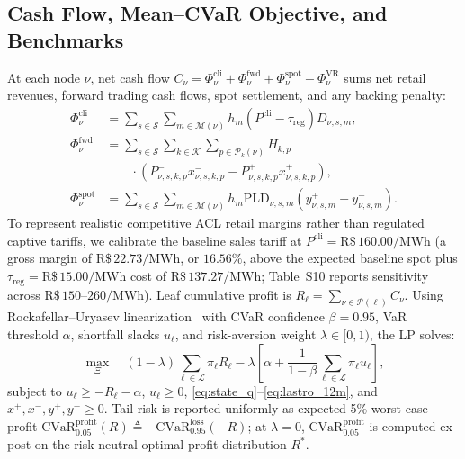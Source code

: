 \documentclass[10pt,journal]{IEEEtran}
\begin{document}
\subsection{Cash Flow, Mean--CVaR Objective, and Benchmarks}
At each node $\nu$, net cash flow $C_\nu = \Phi^{\text{cli}}_\nu + \Phi^{\text{fwd}}_\nu + \Phi^{\text{spot}}_\nu - \Phi^{\text{VR}}_\nu$ sums net retail revenues, forward trading cash flows, spot settlement, and any backing penalty:
\begin{align}
\Phi^{\text{cli}}_\nu &= \sum_{s \in \mathcal{S}} \sum_{m \in \mathcal{M}(\nu)} h_m \left( P^{\text{cli}} - \tau_{\text{reg}} \right) D_{\nu,s,m}, \\
\Phi^{\text{fwd}}_\nu &= \sum_{s \in \mathcal{S}} \sum_{k \in \mathcal{K}} \sum_{p \in \mathcal{P}_k(\nu)} H_{k,p} \nonumber \\
&\qquad \cdot \left( P^-_{\nu,s,k,p} x^-_{\nu,s,k,p} - P^+_{\nu,s,k,p} x^+_{\nu,s,k,p} \right), \\
\Phi^{\text{spot}}_\nu &= \sum_{s \in \mathcal{S}} \sum_{m \in \mathcal{M}(\nu)} h_m \text{PLD}_{\nu,s,m} \left( y^+_{\nu,s,m} - y^-_{\nu,s,m} \right).
\end{align}
To represent realistic competitive ACL retail margins rather than regulated captive tariffs, we calibrate the baseline sales tariff at $P^{\text{cli}} = \text{R\$}\,160.00/\text{MWh}$ (a gross margin of $\text{R\$}\,22.73/\text{MWh}$, or $16.56\%$, above the expected baseline spot plus $\tau_{\text{reg}} = \text{R\$}\,15.00/\text{MWh}$ cost of $\text{R\$}\,137.27/\text{MWh}$; Table~S10 reports sensitivity across $\text{R\$}\,150$--$260/\text{MWh}$). Leaf cumulative profit is $R_\ell = \sum_{\nu \in \mathcal{P}(\ell)} C_\nu$. Using Rockafellar--Uryasev linearization~\cite{RockafellarUryasev2000,RockafellarUryasev2002} with CVaR confidence $\beta = 0.95$, VaR threshold $\alpha$, shortfall slacks $u_\ell$, and risk-aversion weight $\lambda \in [0, 1)$, the LP solves:
\begin{equation}
\max_{\Xi} \quad (1 - \lambda) \sum_{\ell \in \mathcal{L}} \pi_\ell R_\ell - \lambda \left[ \alpha + \frac{1}{1 - \beta} \sum_{\ell \in \mathcal{L}} \pi_\ell u_\ell \right],
\label{eq:cvar_obj}
\end{equation}
subject to $u_\ell \ge -R_\ell - \alpha$, $u_\ell \ge 0$, \eqref{eq:state_q}--\eqref{eq:lastro_12m}, and $x^+, x^-, y^+, y^- \ge 0$. Tail risk is reported uniformly as expected 5\% worst-case profit $\mathrm{CVaR}_{0.05}^{\mathrm{profit}}(R) \triangleq -\mathrm{CVaR}_{0.95}^{\mathrm{loss}}(-R)$; at $\lambda = 0$, $\mathrm{CVaR}_{0.05}^{\mathrm{profit}}$ is computed ex-post on the risk-neutral optimal profit distribution $R^*$.
\end{document}
